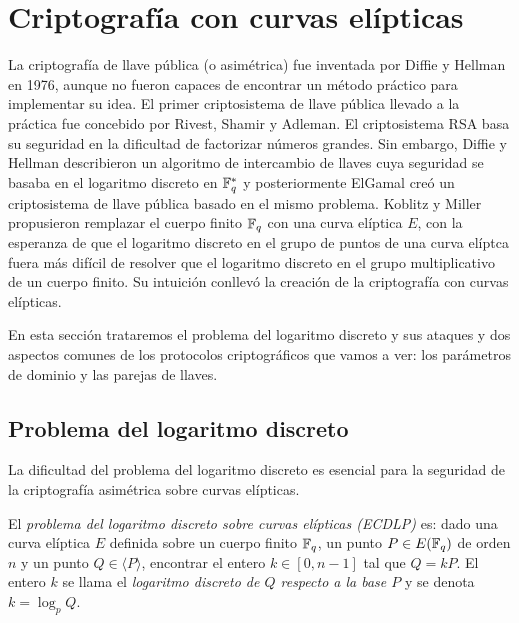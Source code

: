\section{Criptografía con curvas elípticas}
\label{sec:Criptografía con curvas elípticas}

La criptografía de llave pública (o asimétrica) fue inventada por Diffie y Hellman en 1976, aunque no fueron capaces de encontrar un método práctico para implementar su idea. El primer criptosistema de llave pública llevado a la práctica fue concebido por Rivest, Shamir y Adleman. El criptosistema RSA basa su seguridad en la dificultad de factorizar números grandes. Sin embargo, Diffie y Hellman describieron un algoritmo de intercambio de llaves cuya seguridad se basaba en el logaritmo discreto en $\mathbb{F}_q^*$ y posteriormente ElGamal creó un criptosistema de llave pública basado en el mismo problema. Koblitz y Miller propusieron remplazar el cuerpo finito $\mathbb{F}_q$ con una curva elíptica $E$, con la esperanza de que el logaritmo discreto en el grupo de puntos de una curva elíptca fuera más difícil de resolver que el logaritmo discreto en el grupo multiplicativo de un cuerpo finito. Su intuición conllevó la creación de la criptografía con curvas elípticas.



En esta sección trataremos el problema del logaritmo discreto y sus ataques y dos aspectos comunes de los protocolos criptográficos que vamos a ver: los parámetros de dominio y las parejas de llaves.

\subsection{Problema del logaritmo discreto}
\label{sub:Problema del logaritmo discreto}

La dificultad del problema del logaritmo discreto es esencial para la seguridad de la criptografía asimétrica sobre curvas elípticas.

\begin{definicion}
    El \emph{problema del logaritmo discreto sobre curvas elípticas (ECDLP)} es: dado una curva elíptica $E$ definida sobre un cuerpo finito $\mathbb{F}_q$, un punto $P \in E(\mathbb{F}_q)$ de orden $n$ y un punto $Q \in \langle P \rangle$, encontrar el entero $k \in [0, n - 1]$ tal que $Q = k P$. El entero $k$ se llama el \emph{logaritmo discreto de $Q$ respecto a la base $P$} y se denota $k = \log_p Q$.
\end{definicion}

